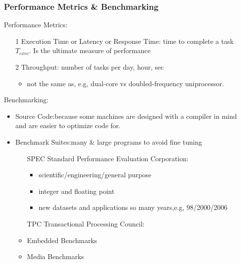 \documentclass{beamer}
\newcommand{\emp}[1]{\textcolor{DikuRed}{ #1}}
\begin{document}
\begin{frame}[fragile,t]
\frametitle{Performance Metrics \& Benchmarking}

Performance Metrics:
\begin{itemize}
    \item[1] \emp{Execution Time or Latency or Response Time}: 
            time to complete a task $T_{exec}$.
            Is the ultimate measure of performance\medskip

    \item[2] \emp{Throughput}: number of tasks per day, hour, sec
        \begin{itemize}
            \item not the same as, e.g, dual-core vs doubled-frequency uniprocessor.
        \end  {itemize}\medskip
\end{itemize}

Benchmarking:\smallskip
\begin{itemize}
    \item Source Code:\pause because some machines are designed with
            a compiler in mind and are easier to optimize code for.\smallskip

    \item Benchmark Suites:\pause many \& large programs to avoid fine tuning
        \begin{itemize}
            \item[SPEC] Standard Performance Evaluation Corporation:
                \begin{itemize}
                    \item scientific/engineering/general purpose
                    \item integer and floating point
                    \item new datasets and applications so 
                            many years,e.g, 98/2000/2006
                \end  {itemize}
            \item[TPC] Transactional Processing Council:
            \item Embedded Benchmarks
            \item Media Benchmarks
        \end  {itemize}
\end  {itemize}
\end{frame}
\end{document}
